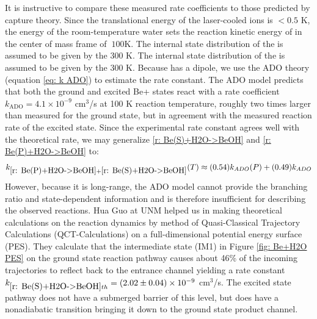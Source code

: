 It is instructive to compare these measured rate coefficients to those predicted by capture theory. Since the translational energy of the laser-cooled  ions is $<0.5$ K, the energy of the room-temperature water sets the reaction kinetic energy of  in the center of mass frame of $~100$K. The internal state distribution of the  is assumed to be given by the 300 K. The internal state distribution of the  is assumed to be given by the 300 K. Because  has a dipole, we use the ADO theory (equation \ref{eq: k ADO}) to estimate the rate constant. The ADO model predicts that both the ground and excited Be+ states react with a rate coefficient $k_{\text{ADO}} = 4.1 \times 10^{-9}$ cm$^3$/s at 100 K reaction temperature, roughly two times larger than measured for the ground state, but in agreement with the measured reaction rate of the excited state. Since the experimental rate constant agrees well with the theoretical rate, we may generalize \ref{r: Be(S)+H2O->BeOH} and \ref{r: Be(P)+H2O->BeOH} to:
\begin{equation}
	k_{\ref{r: Be(P)+H2O->BeOH}+\ref{r: Be(S)+H2O->BeOH}}(T) \approx (0.54)k_{ADO}(P) + (0.49)k_{ADO}
	\label{eq: k Be+H2O(T)}
\end{equation}
However, because it is long-range, the ADO model cannot provide the branching ratio and state-dependent information and is therefore insufficient for describing the observed reactions. Hua Guo at UNM helped us in making theoretical calculations on the reaction dynamics by method of Quasi-Classical Trajectory Calculations (QCT-Calculations) on a full-dimensional potential energy surface (PES).\cite{Yang2018} They calculate that the intermediate state (IM1) in Figure \ref{fig: Be+H2O PES} on the ground state reaction pathway causes about 46\% of the incoming trajectories to reflect back to the entrance channel yielding a rate constant $k_{\ref{r: Be(S)+H2O->BeOH} th} = (2.02 \pm 0.04) \times 10^{-9}$ cm$^3$/s. The excited state pathway does not have a submerged barrier of this level, but does have a nonadiabatic transition bringing it down to the ground state product channel.

